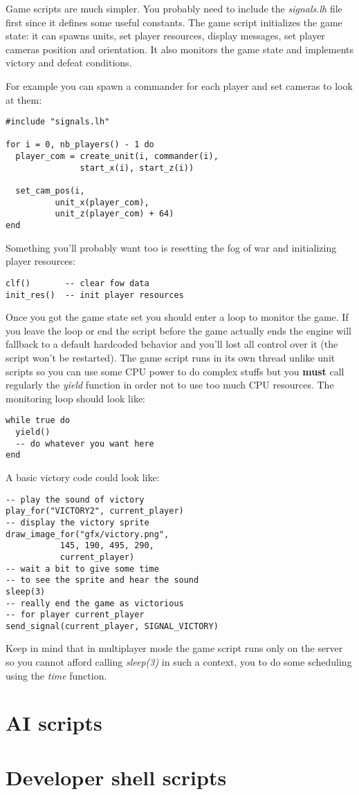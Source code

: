 \documentclass[a4paper,10pt]{article}
\begin{document}
Game scripts are much simpler. You probably need to include the \emph{signals.lh} file first since it defines some useful constants. The game script initializes the game state: it can spawns units, set player resources, display messages, set player cameras position and orientation. It also monitors the game state and implements victory and defeat conditions.

For example you can spawn a commander for each player and set cameras to look at them:
\begin{lstlisting}
#include "signals.lh"

for i = 0, nb_players() - 1 do
  player_com = create_unit(i, commander(i),
			   start_x(i), start_z(i))

  set_cam_pos(i,
	      unit_x(player_com),
	      unit_z(player_com) + 64)
end
\end{lstlisting}

Something you'll probably want too is resetting the fog of war and initializing player resources:
\begin{lstlisting}
clf()		-- clear fow data
init_res()	-- init player resources
\end{lstlisting}

Once you got the game state set you should enter a loop to monitor the game. If you leave the loop or end the script before the game actually ends the engine will fallback to a default hardcoded behavior and you'll lost all control over it (the script won't be restarted). The game script runs in its own thread unlike unit scripts so you can use some CPU power to do complex stuffs but you \textbf{must} call regularly the \emph{yield} function in order not to use too much CPU resources. The monitoring loop should look like:
\begin{lstlisting}
while true do
  yield()
  -- do whatever you want here
end
\end{lstlisting}

A basic victory code could look like:
\begin{lstlisting}
-- play the sound of victory
play_for("VICTORY2", current_player)
-- display the victory sprite
draw_image_for("gfx/victory.png",
	       145, 190, 495, 290,
	       current_player)
-- wait a bit to give some time
-- to see the sprite and hear the sound
sleep(3)
-- really end the game as victorious
-- for player current_player
send_signal(current_player, SIGNAL_VICTORY)
\end{lstlisting}

Keep in mind that in multiplayer mode the game script runs only on the server so you cannot afford calling \emph{sleep(3)} in such a context, you to do some scheduling using the \emph{time} function.

\section{AI scripts}

\section{Developer shell scripts}
\end{document}
